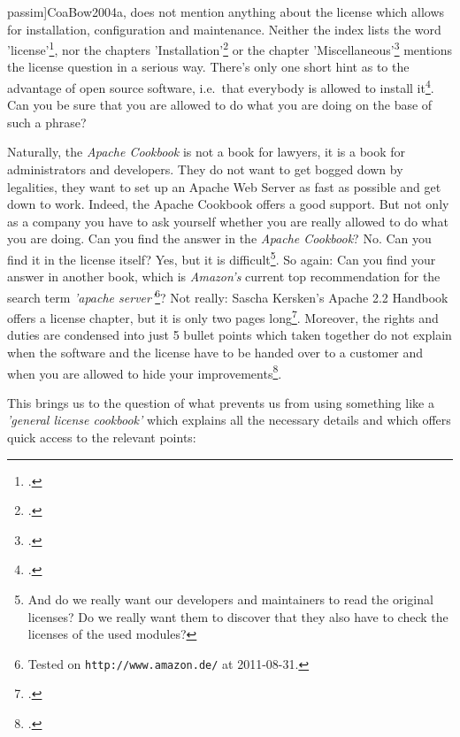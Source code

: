 passim]{CoaBow2004a}, does not mention anything about the license which allows
for installation, configuration and maintenance. Neither the index lists the
word 'license'\footcite[cf.][245ff, esp.\ p.\ 250]{CoaBow2004a}, nor the chapters
'Installation'\footcite[cf.][1ff]{CoaBow2004a} or the chapter
'Miscellaneous'\footcite[cf.][219ff]{CoaBow2004a} mentions the license question
in a serious way. There's only one short hint as to the advantage of open source
software, i.e.\ that everybody is allowed to install it\footcite[cf.][1: \enquote{
\ldots einer der Vorzüge von open source software besteht darin, dass
je\-der\-mann die Erlaubnis zur Erzeugung eines eigenen Installationskits hat
}]{CoaBow2004a}. Can you be sure that you are allowed to do what you are
doing on the base of such a phrase?

Naturally, the \emph{Apache Cookbook} is not a book for lawyers, it is a book for
administrators and developers. They do not want to get bogged down by
legalities, they want to set up an Apache Web Server as fast as possible and get
down to work. Indeed, the Apache Cookbook offers a good support. But not only as
a company you have to ask yourself whether you are really allowed to do what you
are doing. Can you find the answer in the \emph{Apache Cookbook}? No. Can you
find it in the license itself? Yes, but it is difficult\footnote{And do we
really want our developers and maintainers to read the original licenses? Do we
really want them to discover that they also have to check the licenses of the
used modules?}. So again: Can you find your answer in another book, which is
\emph{Amazon's} current top recommendation for the search term \emph{'apache
server'}\footnote{Tested on \texttt{http://www.amazon.de/} at 2011-08-31.}? Not
really: Sascha Kersken's Apache 2.2 Handbook offers a license chapter, but it is
only two pages long\footcite[cf.][111f]{Kersken2009a}. Moreover, the rights and
duties are condensed into just 5 bullet points which taken together do not
explain when the software and the license have to be handed over to a customer
and when you are allowed to hide your
improvements\footcite[cf.][112]{Kersken2009a}.

This brings us to the question of what prevents us from using something like a
\emph{'general license cookbook'} which explains all the necessary details and
which offers  quick access to the relevant points:

